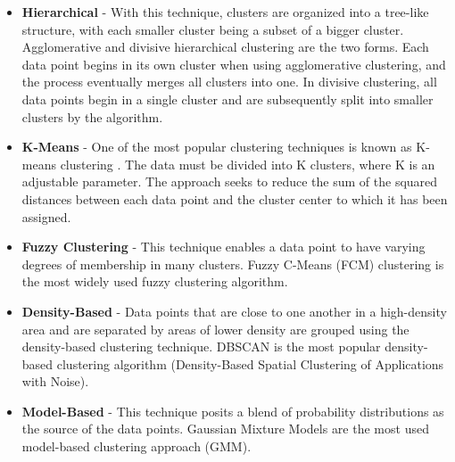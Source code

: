 \documentclass[conference]{IEEEtran}
\begin{document}
\begin{itemize}
    \item \textbf{Hierarchical} - With this technique, clusters are organized into a tree-like structure, with each smaller cluster being a subset of a bigger cluster. Agglomerative \cite{b1} and divisive hierarchical clustering \cite{b2} are the two forms. Each data point begins in its own cluster when using agglomerative clustering, and the process eventually merges all clusters into one. In divisive clustering, all data points begin in a single cluster and are subsequently split into smaller clusters by the algorithm. 
    \item \textbf{K-Means} - One of the most popular clustering techniques is known as K-means clustering \cite{b3}. The data must be divided into K clusters, where K is an adjustable parameter. The approach seeks to reduce the sum of the squared distances between each data point and the cluster center to which it has been assigned.  
    \item \textbf{Fuzzy Clustering} - This technique enables a data point to have varying degrees of membership in many clusters. Fuzzy C-Means (FCM) clustering \cite{b4} is the most widely used fuzzy clustering algorithm. 
    \item \textbf{Density-Based} - Data points that are close to one another in a high-density area and are separated by areas of lower density are grouped using the density-based clustering technique. DBSCAN \cite{b5} is the most popular density-based clustering algorithm (Density-Based Spatial Clustering of Applications with Noise). 
    \item \textbf{Model-Based} - This technique posits a blend of probability distributions as the source of the data points. Gaussian Mixture Models \cite{b6} are the most used model-based clustering approach (GMM). \\
\end{itemize}
\end{document}
